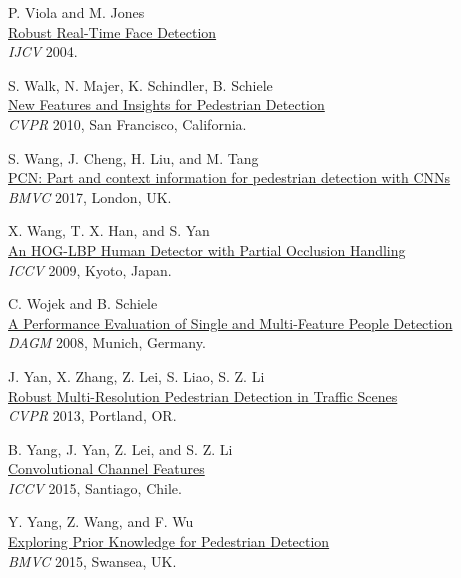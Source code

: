 \documentclass[onecolumn]{article}
\begin{document}
\begin{thebibliography}{1}
P. Viola and M. Jones\\
\href{http://en.wikipedia.org/wiki/Viola-Jones_object_detection_framework}{
Robust Real-Time Face Detection}\\
\textit{IJCV} 2004.

S. Walk, N. Majer, K. Schindler, B. Schiele\\
\href{http://www.d2.mpi-inf.mpg.de/user/31}{
New Features and Insights for Pedestrian Detection}\\
\textit{CVPR} 2010, San Francisco, California.

S. Wang, J. Cheng, H. Liu, and M. Tang\\
\href{https://arxiv.org/abs/1804.04483}{
PCN: Part and context information for pedestrian detection with CNNs}\\
\textit{BMVC} 2017, London, UK.

X. Wang, T. X. Han, and S. Yan\\
\href{http://web.missouri.edu/~hantx}{
An HOG-LBP Human Detector with Partial Occlusion Handling}\\
\textit{ICCV} 2009, Kyoto, Japan.

C. Wojek and B. Schiele\\
\href{http://www.d2.mpi-inf.mpg.de/user/7}{
A Performance Evaluation of Single and Multi-Feature People Detection}\\
\textit{DAGM} 2008, Munich, Germany.

J. Yan, X. Zhang, Z. Lei, S. Liao, S. Z. Li\\
\href{http://www.cv-foundation.org/openaccess/content_cvpr_2013/papers/Yan_Robust_Multi-resolution_Pedestrian_2013_CVPR_paper.pdf}{
Robust Multi-Resolution Pedestrian Detection in Traffic Scenes}\\
\textit{CVPR} 2013, Portland, OR.

B. Yang, J. Yan, Z. Lei, and S. Z. Li\\
\href{http://www.cbsr.ia.ac.cn/users/byang/papers/ccf.pdf}{
Convolutional Channel Features}\\
\textit{ICCV} 2015, Santiago, Chile.

Y. Yang, Z. Wang, and F. Wu\\
\href{http://bmvc2015.swansea.ac.uk/proceedings/papers/paper176/paper176.pdf}{
Exploring Prior Knowledge for Pedestrian Detection}\\
\textit{BMVC} 2015, Swansea, UK.


\end{thebibliography}
\end{document}
